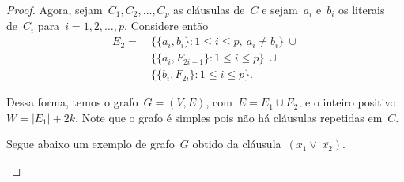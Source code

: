 \begin{proof}
		\bigskip 



		Agora, sejam~$C_1,C_2,\ldots,C_p$ as cláusulas de~$C$ e sejam~$a_i$
		e~$b_i$ os literais de~$C_i$ para~$i=1,2,\ldots,p$.
		Considere então
		\begin{align}
			E_2= \ &\{ \{a_i,b_i\}: 1\le i\le p,\ a_i\ne b_i \}\ \cup 
					\nonumber\\
				&\{\{a_i, F_{2i-1}\}: 1\le i\le p\}\ \cup \nonumber \\
				&\{\{b_i, F_{2i}\}: 1\le i\le p\}. \nonumber
		\end{align}


		Dessa forma, temos o grafo~${G = (V,E)}$, com~${E=E_1\cup E_2}$,
		e o inteiro positivo~${W = |E_1|+2k}$.
		Note que o grafo é simples pois não há cláusulas repetidas em~$C$.

		Segue abaixo um exemplo de grafo~$G$ obtido da
		cláusula~${(x_1\lor\ \overline{x_2})}$.

		\bigskip

		\begin{center} 
\end{center}
\end{proof}
